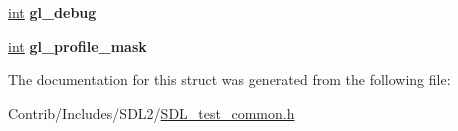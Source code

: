 \begin{DoxyCompactItemize}
\item 
\hyperlink{_s_d_l__thread_8h_a6a64f9be4433e4de6e2f2f548cf3c08e}{int} {\bfseries gl\+\_\+debug}\hypertarget{struct_s_d_l_test___common_state_ac29816854ff281d432b588d12d1e2966}{}\label{struct_s_d_l_test___common_state_ac29816854ff281d432b588d12d1e2966}

\item 
\hyperlink{_s_d_l__thread_8h_a6a64f9be4433e4de6e2f2f548cf3c08e}{int} {\bfseries gl\+\_\+profile\+\_\+mask}\hypertarget{struct_s_d_l_test___common_state_a8e865f85b7cfa8a6e8679eae9163b02c}{}\label{struct_s_d_l_test___common_state_a8e865f85b7cfa8a6e8679eae9163b02c}

\end{DoxyCompactItemize}


The documentation for this struct was generated from the following file\+:\begin{DoxyCompactItemize}
\item 
Contrib/\+Includes/\+S\+D\+L2/\hyperlink{_s_d_l__test__common_8h}{S\+D\+L\+\_\+test\+\_\+common.\+h}\end{DoxyCompactItemize}
